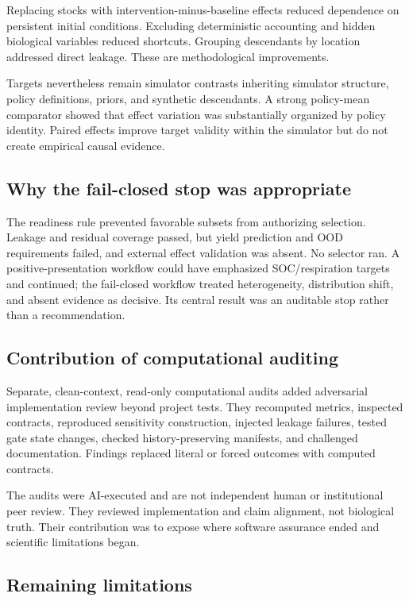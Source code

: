 \documentclass[11pt]{article}
\begin{document}
Replacing stocks with intervention-minus-baseline effects reduced dependence on persistent initial conditions. Excluding deterministic accounting and hidden biological variables reduced shortcuts. Grouping descendants by location addressed direct leakage. These are methodological improvements.

Targets nevertheless remain simulator contrasts inheriting simulator structure, policy definitions, priors, and synthetic descendants. A strong policy-mean comparator showed that effect variation was substantially organized by policy identity. Paired effects improve target validity within the simulator but do not create empirical causal evidence.

\subsection{Why the fail-closed stop was appropriate}

The readiness rule prevented favorable subsets from authorizing selection. Leakage and residual coverage passed, but yield prediction and OOD requirements failed, and external effect validation was absent. No selector ran. A positive-presentation workflow could have emphasized SOC/respiration targets and continued; the fail-closed workflow treated heterogeneity, distribution shift, and absent evidence as decisive. Its central result was an auditable stop rather than a recommendation.

\subsection{Contribution of computational auditing}

Separate, clean-context, read-only computational audits added adversarial implementation review beyond project tests. They recomputed metrics, inspected contracts, reproduced sensitivity construction, injected leakage failures, tested gate state changes, checked history-preserving manifests, and challenged documentation. Findings replaced literal or forced outcomes with computed contracts.

The audits were AI-executed and are not independent human or institutional peer review. They reviewed implementation and claim alignment, not biological truth. Their contribution was to expose where software assurance ended and scientific limitations began.

\subsection{Remaining limitations}
\end{document}
